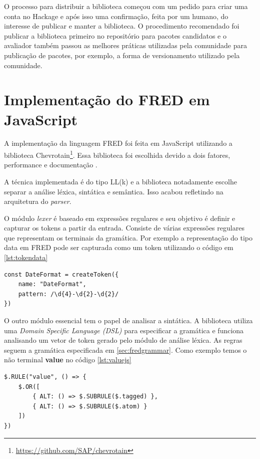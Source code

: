 O processo para distribuir a biblioteca começou com um pedido para criar uma conta no Hackage 
e após isso uma confirmação, feita por um humano, do interesse de publicar e manter a biblioteca.
O procedimento recomendado foi publicar a biblioteca primeiro no repositório para pacotes candidatos
e o avaliador também passou as melhores práticas utilizadas pela comunidade para publicação de pacotes,
por exemplo, a forma de versionamento utilizado pela comunidade.

\section{Implementação do FRED em JavaScript}

A implementação da linguagem FRED foi feita em JavaScript utilizando a biblioteca 
Chevrotain\footnote{\url{https://github.com/SAP/chevrotain}}. Essa biblioteca foi escolhida
devido a dois fatores, performance e documentação \cite{chevrotain}.

A técnica implementada é do tipo LL(k) e a biblioteca notadamente escolhe separar 
a análise léxica, sintática e semântica. Isso acabou refletindo na arquitetura do \textit{parser}. 

O módulo \textit{lexer} é baseado em expressões regulares e seu objetivo é definir e 
capturar os tokens a partir da entrada. Consiste de várias expressões regulares
que representam os terminais da gramática. Por exemplo a representação do tipo data em FRED pode
ser capturada como um token utilizando o código em \ref{lst:tokendata}

\begin{lstlisting}[caption=Definição do token para data,label={lst:tokendata}]
const DateFormat = createToken({
    name: "DateFormat",
    pattern: /\d{4}-\d{2}-\d{2}/
})
\end{lstlisting}

O outro módulo essencial tem o papel de analisar a sintática. A biblioteca utiliza uma 
\textit{Domain Specific Language (DSL)} para especificar a gramática e funciona analisando
um vetor de token gerado pelo módulo de análise léxica. As regras seguem a gramática especificada
em \ref{sec:fredgrammar}. Como exemplo temos o não terminal \textbf{value} no código \ref{lst:valuejs}

\begin{lstlisting}[caption=Definição da regra value em JavaScript,label={lst:valuejs}]
$.RULE("value", () => {
    $.OR([
        { ALT: () => $.SUBRULE($.tagged) },
        { ALT: () => $.SUBRULE($.atom) }
    ])
})
\end{lstlisting}

